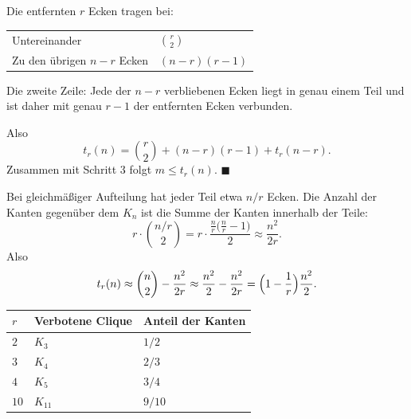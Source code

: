 \begin{merksatz}
Die entfernten $r$ Ecken tragen bei:
\begin{center}
\renewcommand{\arraystretch}{1.45}
\begin{tabular}{@{}P{3.6cm}P{2.4cm}@{}}
\toprule
Untereinander & $\binom{r}{2}$\\
Zu den übrigen $n-r$ Ecken & $(n-r)(r-1)$\\
\bottomrule
\end{tabular}
\end{center}
Die zweite Zeile: Jede der $n-r$ verbliebenen Ecken liegt in genau einem Teil und ist daher mit genau $r-1$ der entfernten Ecken verbunden.

Also
\[ t_r(n) = \binom{r}{2} + (n-r)(r-1) + t_r(n-r) . \]
Zusammen mit Schritt 3 folgt $m \le t_r(n)$. $\blacksquare$
\end{merksatz}

\begin{merksatz}
Bei gleichmäßiger Aufteilung hat jeder Teil etwa $n/r$ Ecken. Die Anzahl der  Kanten gegenüber dem $K_n$ ist die Summe der Kanten innerhalb der Teile:
\[ r \cdot \binom{n/r}{2} = r \cdot \frac{\frac{n}{r}\bigl(\frac{n}{r}-1\bigr)}{2} \approx \frac{n^2}{2r} . \]
Also
\[ t_r(n) \approx \binom{n}{2} - \frac{n^2}{2r} \approx \frac{n^2}{2} - \frac{n^2}{2r} = \Bigl(1-\frac{1}{r}\Bigr)\frac{n^2}{2} . \]

\begin{center}
\renewcommand{\arraystretch}{1.42}
\begin{tabular}{@{}P{1.4cm}P{2.6cm}P{3.2cm}@{}}
\toprule
$r$ & \textbf{Verbotene Clique} & \textbf{Anteil der Kanten}\\
\midrule
$2$ & $K_3$ & $1/2$\\
$3$ & $K_4$ & $2/3$\\
$4$ & $K_5$ & $3/4$\\
$10$ & $K_{11}$ & $9/10$\\
\bottomrule
\end{tabular}
\end{center}

\begin{center}
\begin{minipage}{0.88\textwidth}
\end{minipage}
\end{center}
\end{merksatz}

